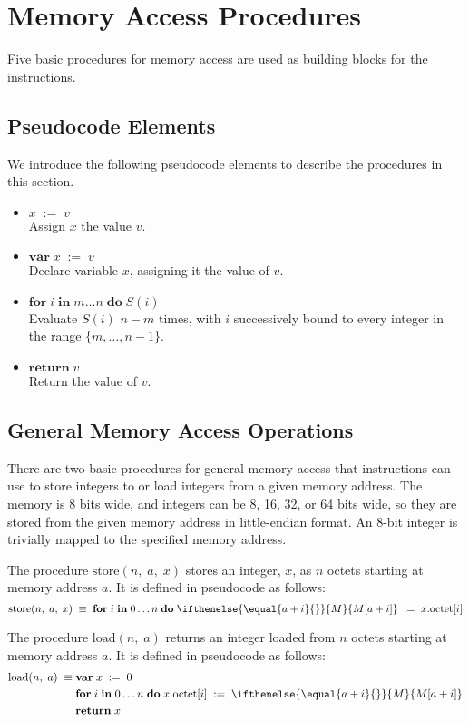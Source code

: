 \documentclass[a4paper,10pt]{article}
\newcommand{\MEM}[1]{\ifthenelse{\equal{#1}{}}{M}{M[#1]}}
\newcommand{\octno}[2]{#1.\mathrm{octet}[#2]}
\newcommand{\range}[2]{\{#1,\ldots,#2\}}
\newcommand{\set}[2]{#1\;:=\;#2}
\newcommand{\Var}[2]{\mathbf{var}\;#1\;:=\;#2\;}
\newcommand{\dotimes}[4]{\mathbf{for}\;#1\;\mathbf{in}\;#2\ldots#3\;\mathbf{do}\;#4}
\newcommand{\return}[1]{\mathbf{return} \; #1}
\newcommand{\Put}[3]{\mathrm{store}(#1,\;#2,\;#3)}
\newcommand{\Get}[2]{\mathrm{load}(#1,\;#2)}
\theoremstyle{definition}
\begin{document}
\section{Memory Access Procedures}

Five basic procedures for memory access are used as building blocks for the instructions.

\subsection{Pseudocode Elements}

We introduce the following pseudocode elements to describe the procedures in this section.
\begin{itemize}
\item $\set{x}{v}$\\Assign $x$ the value $v$.
\item $\Var{x}{v}$\\Declare variable $x$, assigning it the value of $v$.
\item $\dotimes{i}{m}{n}{S(i)}$\\Evaluate $S(i)$ $n-m$ times, with $i$ successively bound to every integer in the range $\range{m}{n-1}$.
\item $\return{v}$\\Return the value of $v$.
\end{itemize}

\subsection{General Memory Access Operations}

There are two basic procedures for general memory access that instructions can use to store integers to or load integers from a given memory address.
The memory is 8 bits wide, and integers can be 8, 16, 32, or 64 bits wide, so they are stored from the given memory address in little-endian format.
An 8-bit integer is trivially mapped to the specified memory address.

The procedure $\Put{n}{a}{x}$ stores an integer, $x$, as $n$ octets starting at memory address $a$.
It is defined in pseudocode as follows:
\begin{equation}
  \Put{n}{a}{x} \; \equiv \; \dotimes{i}{0}{n}{\set{\MEM{a + i}}{\octno{x}{i}}}
\end{equation}

The procedure $\Get{n}{a}$ returns an integer loaded from $n$ octets starting at memory address $a$.
It is defined in pseudocode as follows:
\begin{equation}
  \begin{split}
  \Get{n}{a} \; \equiv \; & \Var{x}{0} \\
  & \dotimes{i}{0}{n}{\set{\octno{x}{i}}{\MEM{a + i}}} \\
  & \return{x}
  \end{split}
\end{equation}
\end{document}
